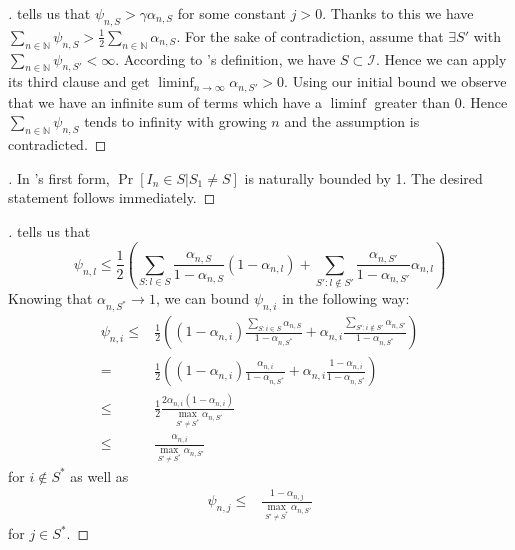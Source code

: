 \begin{proof}[]
   tells us that $\psi_{n, S} > \gamma
  \alpha_{n, S}$ for some constant $j > 0$. Thanks to this we have $\sum_{n \in
  \mathbb{N}} \psi_{n, S} > \frac{1}{2} \sum_{n \in \mathbb{N}} \alpha_{n, S}$.
  For the sake of contradiction, assume that $\exists S'$ with $\sum_{n \in
  \mathbb{N}} \psi_{n, S'} < \infty$. According to
  's definition, we have $S \subset \mathcal{I}$.
  Hence we can apply its third clause and get $\liminf_{n \rightarrow \infty}
  \alpha_{n, S'} > 0$. Using our initial bound we observe that we have an
  infinite sum of terms which have a $\liminf$ greater than 0. Hence $\sum_{n
  \in \mathbb{N}} \psi_{n, S}$ tends to infinity with growing $n$ and the
  assumption is contradicted.
\end{proof}

\begin{proof}[]
  In 's first form,  $\Pr[I_n \in S | S_1
  \neq S]$ is naturally bounded by 1. The desired statement follows immediately.
\end{proof}

\begin{proof}[]
   tells us that
  \[\psi_{n, l} \leq \frac{1}{2}(\sum_{S: l \in S} \frac{\alpha_{n, S}}{1 -
      \alpha_{n, S}} (1 - \alpha_{n, l}) +  \sum_{S': l \notin S'}
      \frac{\alpha_{n, S'}}{1 - \alpha_{n, S'}} \alpha_{n, l})\]
  Knowing that $\alpha_{n, S^*} \rightarrow 1$, we can bound $\psi_{n, i}$ in
  the following way:
  \begin{align}
    \psi_{n, i} \leq& \frac{1}{2}((1 - \alpha_{n, i}) \frac{\sum_{S: i \in S}
        \alpha_{n, S}}{1 - \alpha_{n, S^*}} + \alpha_{n, i} \frac{\sum_{S': i
        \notin S'} \alpha_{n, S'}}{1 - \alpha_{n, S^*}}) \\
      =& \frac{1}{2}((1 - \alpha_{n, i}) \frac{\alpha_{n, i}}{1 - \alpha_{n,
          S^*}} + \alpha_{n, i} \frac{1 - \alpha_{n, i}}{1 - \alpha_{n, S^*}})\\
      \leq& \frac{1}{2} \frac{2 \alpha_{n, i} (1 - \alpha_{n, i})}{\max_{S'
          \neq S^*} \alpha_{n, S'}} \\
      \leq& \frac{\alpha_{n, i}}{\max_{S' \neq S^*} \alpha_{n, S'}}
  \end{align}
  for $i \notin S^*$ as well as
  \begin{align}
    \psi_{n, j} \leq& \frac{1 - \alpha_{n, j}}{\max_{S' \neq S^*} \alpha_{n,
        S'}}
  \end{align}
  for $j \in S^*$.
\end{proof}

